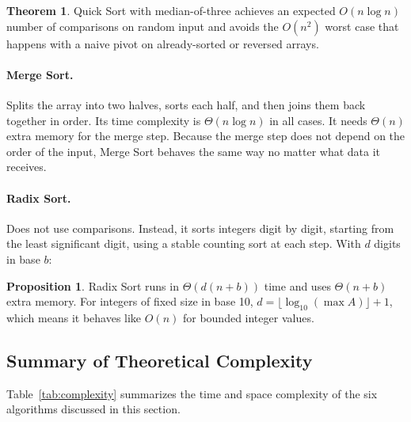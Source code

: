 \documentclass[12pt,a4paper]{article}
\theoremstyle{definition}
\newtheorem{theorem}{Theorem}[section]
\newtheorem{proposition}{Proposition}[section]
\begin{document}
\begin{theorem}
Quick Sort with median-of-three achieves an expected $O(n \log n)$ number of comparisons on random input and avoids the $O(n^2)$ worst case that happens with a naive pivot on already-sorted or reversed arrays.
\end{theorem}

\paragraph{Merge Sort.}
Splits the array into two halves, sorts each half, and then joins them back together in order. Its time complexity is $\Theta(n \log n)$ in all cases. It needs $\Theta(n)$ extra memory for the merge step. Because the merge step does not depend on the order of the input, Merge Sort behaves the same way no matter what data it receives.

\paragraph{Radix Sort.}
Does not use comparisons. Instead, it sorts integers digit by digit, starting from the least significant digit, using a stable counting sort at each step. With $d$ digits in base $b$:

\begin{proposition}
Radix Sort runs in $\Theta(d(n + b))$ time and uses $\Theta(n + b)$ extra memory. For integers of fixed size in base 10, $d = \lfloor\log_{10}(\max A)\rfloor + 1$, which means it behaves like $O(n)$ for bounded integer values.
\end{proposition}

\subsection{Summary of Theoretical Complexity}

Table~\ref{tab:complexity} summarizes the time and space complexity of the six algorithms discussed in this section.
\end{document}

